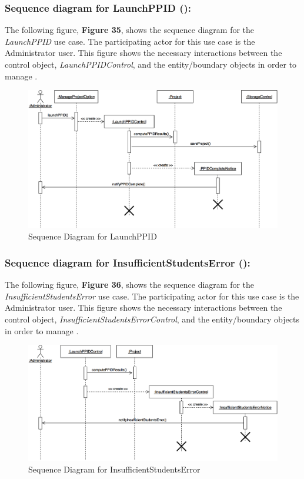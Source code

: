 \documentclass[12pt,letterpaper]{article}
\begin{document}
\subsubsection*{Sequence diagram for LaunchPPID (\launchppid{}):}

The following figure, {\bf Figure 35}, shows the sequence diagram for the {\it LaunchPPID} use case. The participating actor for this use case is
the Administrator user. This figure shows the necessary interactions between the control object, {\it LaunchPPIDControl}, and the
entity/boundary objects in order to manage \launchppid{}.

\begin{figure}[H]
	\centering{}
	\includegraphics[scale=0.3]{imgs/seq/launch-ppid.png}
	\caption{Sequence Diagram for LaunchPPID}
\end{figure}

\subsubsection*{Sequence diagram for InsufficientStudentsError (\insufficientstudentserror{}):}

The following figure, {\bf Figure 36}, shows the sequence diagram for the {\it InsufficientStudentsError} use case. The participating actor for this use case is
the Administrator user. This figure shows the necessary interactions between the control object, {\it InsufficientStudentsErrorControl}, and the
entity/boundary objects in order to manage \insufficientstudentserror{}.

\begin{figure}[H]
	\centering{}
	\includegraphics[scale=0.3]{imgs/seq/insufficient-students-error.png}
	\caption{Sequence Diagram for InsufficientStudentsError}
\end{figure}
\end{document}
